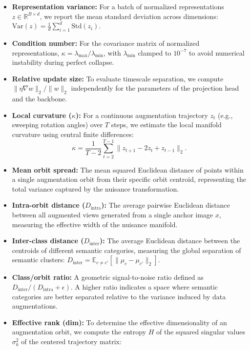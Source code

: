 \documentclass{article}
\theoremstyle{plain}
\theoremstyle{definition}
\theoremstyle{remark}
\begin{document}
\begin{itemize}[leftmargin=*]
    \item \textbf{Representation variance:} For a batch of normalized representations $z \in \mathbb{R}^{B \times d}$, we report the mean standard deviation across dimensions: $\mathrm{Var}(z) = \frac{1}{d}\sum_{i=1}^d \mathrm{Std}(z_i)$.
    \item \textbf{Condition number:} For the covariance matrix of normalized representations, $\kappa = \lambda_{\max} / \lambda_{\min}$, with $\lambda_{\min}$ clamped to $10^{-7}$ to avoid numerical instability during perfect collapse.
    \item \textbf{Relative update size:} To evaluate timescale separation, we compute $\|\eta \nabla w\|_2 / \|w\|_2$ independently for the parameters of the projection head and the backbone.
    \item \textbf{Local curvature ($\kappa$):} For a continuous augmentation trajectory $z_t$ (e.g., sweeping rotation angles) over $T$ steps, we estimate the local manifold curvature using central finite differences:
    \begin{equation*}
        \kappa = \frac{1}{T-2} \sum_{t=2}^{T-1} \|z_{t+1} - 2z_t + z_{t-1}\|_2.
    \end{equation*}
    \item \textbf{Mean orbit spread:} The mean squared Euclidean distance of points within a single augmentation orbit from their specific orbit centroid, representing the total variance captured by the nuisance transformation.
    \item \textbf{Intra-orbit distance ($D_{\text{intra}}$):} The average pairwise Euclidean distance between all augmented views generated from a single anchor image $x$, measuring the effective width of the nuisance manifold.
    \item \textbf{Inter-class distance ($D_{\text{inter}}$):} The average Euclidean distance between the centroids of different semantic categories, measuring the global separation of semantic clusters: $D_{\text{inter}} = \mathbb{E}_{c \neq c'} [\|\mu_c - \mu_{c'}\|_2]$.
    \item \textbf{Class/orbit ratio:} A geometric signal-to-noise ratio defined as $D_{\text{inter}} / (D_{\text{intra}} + \epsilon)$. A higher ratio indicates a space where semantic categories are better separated relative to the variance induced by data augmentations.
    \item \textbf{Effective rank (dim):} To determine the effective dimensionality of an augmentation orbit, we compute the entropy $H$ of the squared singular values $\sigma_k^2$ of the centered trajectory matrix:

\end{itemize}
\end{document}
